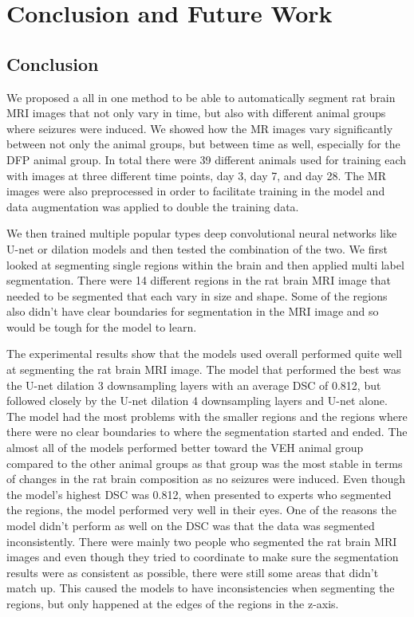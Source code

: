 \chapter{Conclusion and Future Work}
\section{Conclusion}
    We proposed a all in one method to be able to automatically segment rat brain MRI images that not only vary in time, but also with different animal groups where seizures were induced. 
    We showed how the MR images vary significantly between not only the animal groups, but between time as well, especially for the DFP animal group. 
    In total there were 39 different animals used for training each with images at three different time points, day 3, day 7, and day 28. 
    The MR images were also preprocessed in order to facilitate training in the model and data augmentation was applied to double the training data.
    
    We then trained multiple popular types deep convolutional neural networks like U-net or dilation models and then tested the combination of the two. 
    We first looked at segmenting single regions within the brain and then applied multi label segmentation. 
    There were 14 different regions in the rat brain MRI image that needed to be segmented that each vary in size and shape. 
    Some of the regions also didn't have clear boundaries for segmentation in the MRI image and so would be tough for the model to learn. 
    
    The experimental results show that the models used overall performed quite well at segmenting the rat brain MRI image. 
    The model that performed the best was the U-net dilation 3 downsampling layers with an average DSC of 0.812, but followed closely by the U-net dilation 4 downsampling layers and U-net alone. 
    The model had the most problems with the smaller regions and the regions where there were no clear boundaries to where the segmentation started and ended. 
    The almost all of the models performed better toward the VEH animal group compared to the other animal groups as that group was the most stable in terms of changes in the rat brain composition as no seizures were induced.
    Even though the model's highest DSC was 0.812, when presented to experts who segmented the regions, the model performed very well in their eyes.
    One of the reasons the model didn't perform as well on the DSC was that the data was segmented inconsistently.
    There were mainly two people who segmented the rat brain MRI images and even though they tried to coordinate to make sure the segmentation results were as consistent as possible, there were still some areas that didn't match up.
    This caused the models to have inconsistencies when segmenting the regions, but only happened at the edges of the regions in the z-axis. 
    

